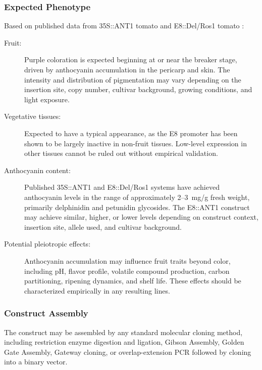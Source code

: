 \documentclass[12pt,a4paper]{article}
\begin{document}
\subsubsection{Expected Phenotype}

Based on published data from 35S::ANT1 tomato \citep{Mathews2003} and E8::Del/Ros1 tomato \citep{Butelli2008}:
\begin{description}
  \item[Fruit:] Purple coloration is expected beginning at or near the breaker stage, driven by anthocyanin accumulation in the pericarp and skin. The intensity and distribution of pigmentation may vary depending on the insertion site, copy number, cultivar background, growing conditions, and light exposure.
  \item[Vegetative tissues:] Expected to have a typical appearance, as the E8 promoter has been shown to be largely inactive in non-fruit tissues. Low-level expression in other tissues cannot be ruled out without empirical validation.
  \item[Anthocyanin content:] Published 35S::ANT1 and E8::Del/Ros1 systems have achieved anthocyanin levels in the range of approximately 2--3~mg/g fresh weight, primarily delphinidin and petunidin glycosides. The E8::ANT1 construct may achieve similar, higher, or lower levels depending on construct context, insertion site, allele used, and cultivar background.
  \item[Potential pleiotropic effects:] Anthocyanin accumulation may influence fruit traits beyond color, including pH, flavor profile, volatile compound production, carbon partitioning, ripening dynamics, and shelf life. These effects should be characterized empirically in any resulting lines.
\end{description}

\subsubsection{Construct Assembly}

The construct may be assembled by any standard molecular cloning method, including restriction enzyme digestion and ligation, Gibson Assembly, Golden Gate Assembly, Gateway cloning, or overlap-extension PCR followed by cloning into a binary vector.
\end{document}

